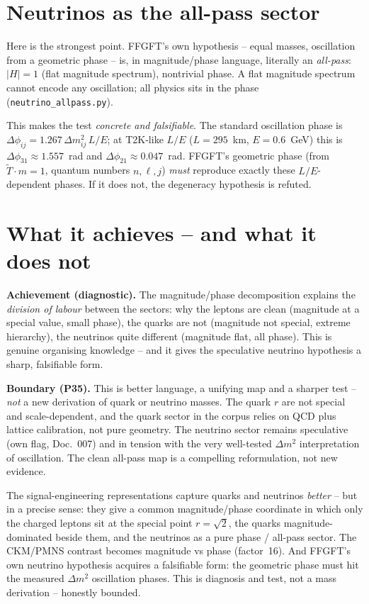 \section{Neutrinos as the all-pass sector}
Here is the strongest point. FFGFT's own hypothesis -- equal masses, oscillation from a geometric phase
-- is, in magnitude/phase language, literally an \emph{all-pass}: $|H|=1$ (flat magnitude spectrum),
nontrivial phase. A flat magnitude spectrum cannot encode any oscillation; all physics sits in the
phase (\texttt{neutrino\_allpass.py}).

This makes the test \emph{concrete and falsifiable}. The standard oscillation phase is
$\Delta\phi_{ij}=1{.}267\,\Delta m^2_{ij}\,L/E$; at T2K-like $L/E$ ($L=295$~km, $E=0{.}6$~GeV) this is
$\Delta\phi_{31}\approx1{.}557$~rad and $\Delta\phi_{21}\approx0{.}047$~rad. FFGFT's geometric phase
(from $\tilde T\cdot m=1$, quantum numbers $n,\ell,j$) \emph{must} reproduce exactly these
$L/E$-dependent phases. If it does not, the degeneracy hypothesis is refuted.

\section{What it achieves -- and what it does not}
\begin{important}
\textbf{Achievement (diagnostic).} The magnitude/phase decomposition explains the \emph{division of
labour} between the sectors: why the leptons are clean (magnitude at a special value, small phase), the
quarks are not (magnitude not special, extreme hierarchy), the neutrinos quite different (magnitude
flat, all phase). This is genuine organising knowledge -- and it gives the speculative neutrino
hypothesis a sharp, falsifiable form.

\textbf{Boundary (P35).} This is better language, a unifying map and a sharper test -- \emph{not} a new
derivation of quark or neutrino masses. The quark $r$ are not special and scale-dependent, and the
quark sector in the corpus relies on QCD plus lattice calibration, not pure geometry. The neutrino
sector remains speculative (own flag, Doc.~007) and in tension with the very well-tested $\Delta m^2$
interpretation of oscillation. The clean all-pass map is a compelling reformulation, not new evidence.
\end{important}

\begin{conclusionBox}
The signal-engineering representations capture quarks and neutrinos \emph{better} -- but in a precise
sense: they give a common magnitude/phase coordinate in which only the charged leptons sit at the
special point $r=\sqrt2$, the quarks magnitude-dominated beside them, and the neutrinos as a pure
phase / all-pass sector. The CKM/PMNS contrast becomes magnitude vs phase (factor~16). And FFGFT's own
neutrino hypothesis acquires a falsifiable form: the geometric phase must hit the measured $\Delta m^2$
oscillation phases. This is diagnosis and test, not a mass derivation -- honestly bounded.
\end{conclusionBox}
